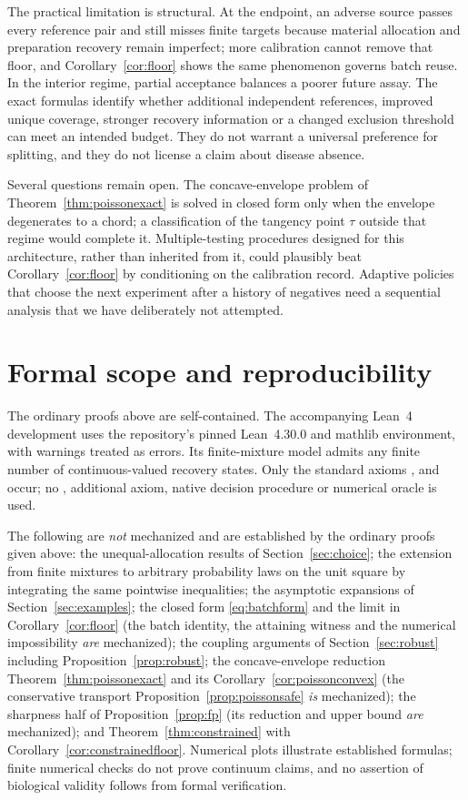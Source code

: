 \documentclass[11pt]{article}
\theoremstyle{remark}\newtheorem{remark}[theorem]{Remark}
\begin{document}
The practical limitation is structural. At the endpoint, an adverse source passes
every reference pair and still misses finite targets because material allocation
and preparation recovery remain imperfect; more calibration cannot remove that
floor, and Corollary~\ref{cor:floor} shows the same phenomenon governs batch
reuse. In the interior regime, partial acceptance balances a poorer future assay.
The exact formulas identify whether additional independent references, improved
unique coverage, stronger recovery information or a changed exclusion threshold
can meet an intended budget. They do not warrant a universal preference for
splitting, and they do not license a claim about disease absence.

Several questions remain open. The concave-envelope problem of
Theorem~\ref{thm:poissonexact} is solved in closed form only when the envelope
degenerates to a chord; a classification of the tangency point $\tau$ outside
that regime would complete it.
Multiple-testing procedures designed for this architecture, rather than inherited
from it, could plausibly beat Corollary~\ref{cor:floor} by conditioning on the
calibration record. Adaptive policies that choose the next experiment after a
history of negatives need a sequential analysis that we have deliberately not
attempted.

\appendix
\section{Formal scope and reproducibility}\label{app:formal}
The ordinary proofs above are self-contained. The accompanying Lean~4
development \cite{lean4,mathlib2020} uses the repository's pinned Lean~4.30.0 and
mathlib environment, with warnings treated as errors. Its finite-mixture model
admits any finite number of continuous-valued recovery states. Only the standard
axioms ,  and  occur; no
, additional axiom, native decision procedure or numerical oracle is
used.



The following are \emph{not} mechanized and are established by the ordinary
proofs given above: the unequal-allocation results of Section~\ref{sec:choice};
the extension from finite mixtures to arbitrary probability laws on the unit
square by integrating the same pointwise inequalities; the asymptotic
expansions of Section~\ref{sec:examples}; the closed form
\eqref{eq:batchform} and the limit in Corollary~\ref{cor:floor} (the batch
identity, the attaining witness and the numerical impossibility \emph{are}
mechanized); the coupling arguments of Section~\ref{sec:robust} including
Proposition~\ref{prop:robust}; the concave-envelope reduction
Theorem~\ref{thm:poissonexact} and its Corollary~\ref{cor:poissonconvex} (the
conservative transport Proposition~\ref{prop:poissonsafe} \emph{is} mechanized);
the sharpness half of Proposition~\ref{prop:fp} (its reduction and upper bound
\emph{are} mechanized); and Theorem~\ref{thm:constrained} with
Corollary~\ref{cor:constrainedfloor}. Numerical plots illustrate established
formulas; finite numerical checks do not prove continuum claims, and no assertion
of biological validity follows from formal verification.
\end{document}
